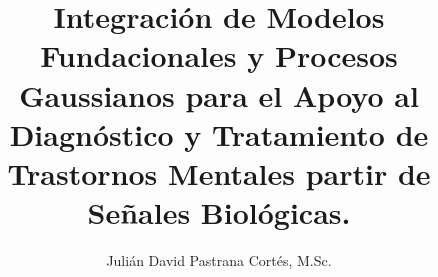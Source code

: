 \usepackage[es-tabla]{babel}
\usepackage{parskip}
\usepackage[capitalise, noabbrev]{cleveref}



\title{
	\textbf{
		Integración de Modelos Fundacionales y Procesos Gaussianos para el Apoyo al Diagnóstico y Tratamiento de Trastornos Mentales partir de Señales Biológicas.
	}
	}
\author{
	Julián David Pastrana Cortés, M.Sc.
	}


\date{}